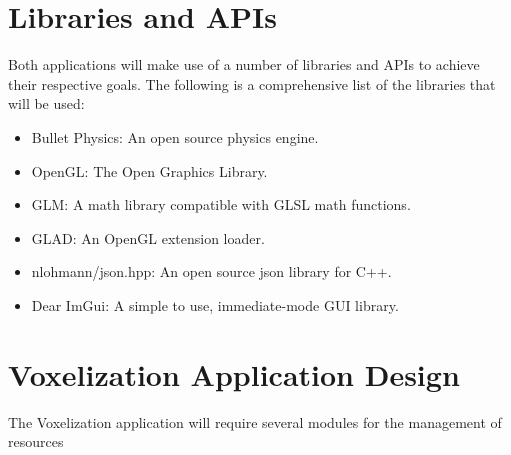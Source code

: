 \section{Libraries and APIs}

Both applications will make use of a number of libraries and APIs to achieve their respective goals. 
The following is a comprehensive list of the libraries that will be used:

\begin{itemize}
  \item Bullet Physics: An open source physics engine.
  \item OpenGL: The Open Graphics Library.
  \item GLM: A math library compatible with GLSL math functions.
  \item GLAD: An OpenGL extension loader.
  \item nlohmann/json.hpp: An open source json library for C++.
  \item Dear ImGui: A simple to use, immediate-mode GUI library.
\end{itemize}

\section{Voxelization Application Design}

The Voxelization application will require several modules for the management of resources 




